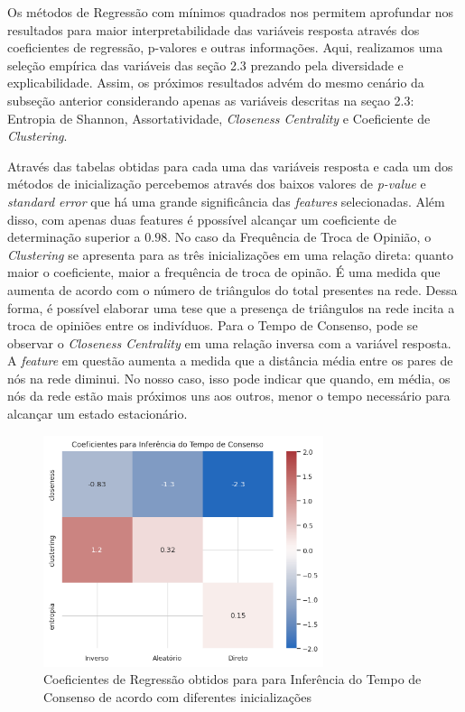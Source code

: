 Os métodos de Regressão com mínimos quadrados nos permitem aprofundar
nos resultados para maior interpretabilidade das variáveis resposta
através dos coeficientes de regressão, p-valores e outras informações.
Aqui, realizamos uma seleção empírica das variáveis das seção 2.3
prezando pela diversidade e explicabilidade. Assim, os próximos
resultados advém do mesmo cenário da subseção anterior considerando
apenas as variáveis descritas na seçao 2.3: Entropia de Shannon,
Assortatividade, \emph{Closeness Centrality} e Coeficiente de
\emph{Clustering}.

Através das tabelas obtidas para cada uma das variáveis resposta e cada
um dos métodos de inicialização percebemos através dos baixos valores de
\emph{p-value} e \emph{standard error} que há uma grande significância
das \emph{features} selecionadas. Além disso, com apenas duas features é
ppossível alcançar um coeficiente de determinação superior a \(0.98\).
No caso da Frequência de Troca de Opinião, o \emph{Clustering} se
apresenta para as três inicializações em uma relação direta: quanto
maior o coeficiente, maior a frequência de troca de opinão. É uma medida
que aumenta de acordo com o número de triângulos do total presentes na
rede. Dessa forma, é possível elaborar uma tese que a presença de
triângulos na rede incita a troca de opiniões entre os indivíduos. Para
o Tempo de Consenso, pode se observar o \emph{Closeness Centrality} em
uma relação inversa com a variável resposta. A \emph{feature} em questão
aumenta a medida que a distância média entre os pares de nós na rede
diminui. No nosso caso, isso pode indicar que quando, em média, os nós
da rede estão mais próximos uns aos outros, menor o tempo necessário
para alcançar um estado estacionário.

\begin{figure}
\centering
\includegraphics[width=\textwidth,height=2.66667in]{consensus_heatmap.png}
\caption{Coeficientes de Regressão obtidos para para Inferência do Tempo
de Consenso de acordo com diferentes inicializações}
\end{figure}

